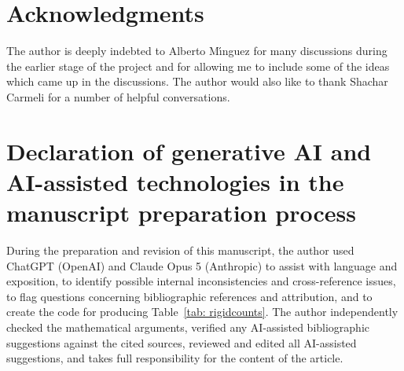 \documentclass[12pt]{article}
\begin{document}
\section*{Acknowledgments}

The author is deeply indebted to Alberto M\'{\i}nguez for many discussions during the earlier stage of the project
and for allowing me to include some of the ideas which came up in the discussions.
The author would also like to thank Shachar Carmeli for a number of helpful conversations.



\section*{Declaration of generative AI and AI-assisted technologies in
the manuscript preparation process}

During the preparation and revision of this manuscript, the author used
ChatGPT (OpenAI) and Claude Opus 5 (Anthropic) to assist with language and exposition, to identify
possible internal inconsistencies and cross-reference issues, to flag
questions concerning bibliographic references and attribution, and to create the code for producing Table~\ref{tab: rigidcounts}. The author
independently checked the mathematical arguments, verified any
AI-assisted bibliographic suggestions against the cited sources, reviewed
and edited all AI-assisted suggestions, and takes full responsibility for
the content of the article.
\end{document}

